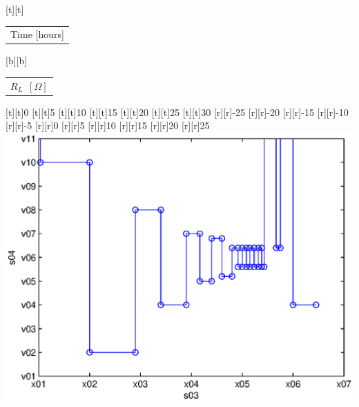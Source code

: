 %    
%
%
\begin{psfrags}%
\psfragscanon%
%
[t][t]{\color[rgb]{0,0,0}\setlength{\tabcolsep}{0pt}\begin{tabular}{c}Time [hours]\end{tabular}}%
[b][b]{\color[rgb]{0,0,0}\setlength{\tabcolsep}{0pt}\begin{tabular}{c}$R_L$\ $[\Omega]$\end{tabular}}%
%
[t][t]{0}%
[t][t]{5}%
[t][t]{10}%
[t][t]{15}%
[t][t]{20}%
[t][t]{25}%
[t][t]{30}%
%
[r][r]{-25}%
[r][r]{-20}%
[r][r]{-15}%
[r][r]{-10}%
[r][r]{-5}%
[r][r]{0}%
[r][r]{5}%
[r][r]{10}%
[r][r]{15}%
[r][r]{20}%
[r][r]{25}%
%
\includegraphics[width=15cm]{input.eps}%
\end{psfrags}%
%
